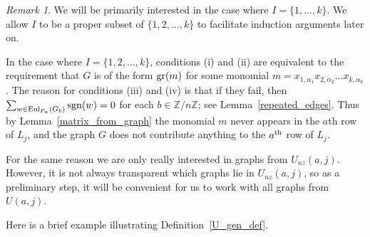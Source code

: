 \documentclass{amsproc}
\theoremstyle{definition}
\theoremstyle{remark}
\newtheorem{remark}[theorem]{Remark}
\numberwithin{equation}{section}
\newcommand{\bbZ}{{\mathbb Z}}
\newcommand{\sgn}{{\rm sgn}}
\newcommand{\gr}{{\rm gr}}
\newcommand{\uni}{{\rm Eul}}
\begin{document}
\begin{remark}
We will be primarily interested in the case where $I = \{ 1, \ldots, k \}$. We allow $I$ to be a proper subset of $\{ 1, 2, \ldots, k \}$ to facilitate induction arguments later on.

In the case where $I = \{ 1, 2, \ldots, k \}$, conditions (i) and (ii) are equivalent to the requirement 
that $G$ is of the form $\gr(m)$ for some monomial $m = x_{1, \alpha_1} x_{2, \alpha_2} \ldots x_{k, \alpha_k}$. The reason for conditions (iii) and (iv) 
is that if they fail, then $\sum_{w\in \uni_{P_a}(G_b)}\sgn(w) = 0$ for each $b \in \bbZ/ n \bbZ$; see Lemma~\ref{repeated_edges}.
Thus by Lemma~\ref{matrix_from_graph} the monomial $m$ never appears in the $a$th row of $L_j$, 
and the graph $G$ does not contribute anything to the $a^{\rm th}$ row of $L_j$. 

For the same reason we are only really interested in graphs from $U_{nz}(a, j)$. 
However, it is not always transparent which graphs lie in $U_{nz}(a, j)$, so as a preliminary step, 
it will be convenient for us to work with all graphs from $U(a, j)$.
\end{remark}

Here is a brief example illustrating Definition~\ref{U_gen_def}.
\end{document}
